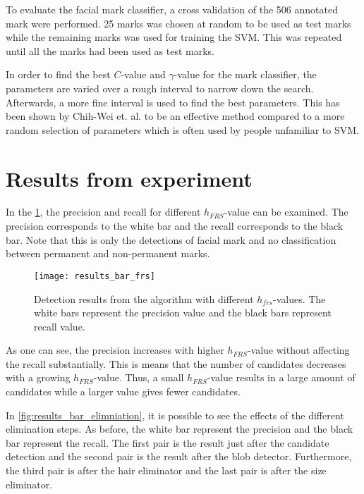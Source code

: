 To evaluate the facial mark classifier, a cross validation of the 506 annotated mark were performed. 25 marks was chosen at random to be used as test marks while the remaining marks was used for training the SVM. This was repeated until all the marks had been used as test marks.

In order to find the best $C$-value and $\gamma$-value for the mark classifier, the parameters are varied over a rough interval to narrow down the search. Afterwards, a more fine interval is used to find the best parameters. This has been shown by Chih-Wei et. al. \cite{svm_guide}  to be an effective method compared to a more random selection of parameters which is often used by people unfamiliar to SVM. 

\section{Results from experiment}

In the \cref{fig:results_bar_frs}, the precision and recall for different $h_{FRS}$-value can be examined. The precision corresponds to the white bar and the recall corresponds to the black bar. Note that this is only the detections of facial mark and no classification between permanent and non-permanent marks. 

\begin{figure}[h!]
	\centering
	\texttt{[image: results\_bar\_frs]}
	\caption{Detection results from the algorithm with different $h_{frs}$-values. The white bars represent the precision value and the black bars represent recall value.  \label{fig:results_bar_frs}}
\end{figure}

As one can see, the precision increases with higher $h_{FRS}$-value without affecting the recall substantially. This is means that the number of candidates decreases with a growing $h_{FRS}$-value. Thus, a small $h_{FRS}$-value results in a large amount of candidates while a larger value gives fewer candidates.

In \cref{fig:results_bar_elimniation}, it is possible to see the effects of the different elimination steps. As before, the white bar represent the precision and the black bar represent the recall. The first pair is the result just after the candidate detection and the second pair is the result after the blob detector. Furthermore, the third pair is after the hair eliminator and the last pair is after the size eliminator. 

